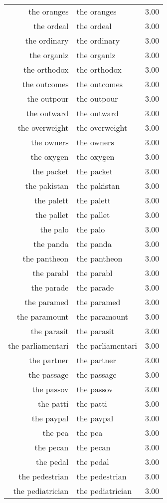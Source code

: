 \begin{table}[ht]
\begin{tabular}{rlr}
  the oranges & the oranges & 3.00 \\ 
  the ordeal & the ordeal & 3.00 \\ 
  the ordinary & the ordinary & 3.00 \\ 
  the organiz & the organiz & 3.00 \\ 
  the orthodox & the orthodox & 3.00 \\ 
  the outcomes & the outcomes & 3.00 \\ 
  the outpour & the outpour & 3.00 \\ 
  the outward & the outward & 3.00 \\ 
  the overweight & the overweight & 3.00 \\ 
  the owners & the owners & 3.00 \\ 
  the oxygen & the oxygen & 3.00 \\ 
  the packet & the packet & 3.00 \\ 
  the pakistan & the pakistan & 3.00 \\ 
  the palett & the palett & 3.00 \\ 
  the pallet & the pallet & 3.00 \\ 
  the palo & the palo & 3.00 \\ 
  the panda & the panda & 3.00 \\ 
  the pantheon & the pantheon & 3.00 \\ 
  the parabl & the parabl & 3.00 \\ 
  the parade & the parade & 3.00 \\ 
  the paramed & the paramed & 3.00 \\ 
  the paramount & the paramount & 3.00 \\ 
  the parasit & the parasit & 3.00 \\ 
  the parliamentari & the parliamentari & 3.00 \\ 
  the partner & the partner & 3.00 \\ 
  the passage & the passage & 3.00 \\ 
  the passov & the passov & 3.00 \\ 
  the patti & the patti & 3.00 \\ 
  the paypal & the paypal & 3.00 \\ 
  the pea & the pea & 3.00 \\ 
  the pecan & the pecan & 3.00 \\ 
  the pedal & the pedal & 3.00 \\ 
  the pedestrian & the pedestrian & 3.00 \\ 
  the pediatrician & the pediatrician & 3.00 \\ 

\end{tabular}
\end{table}

